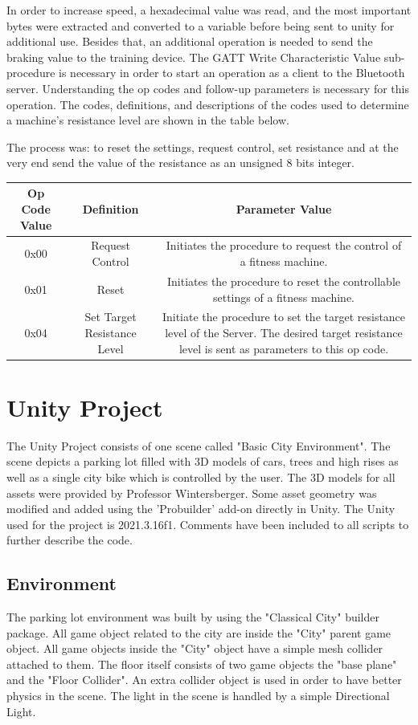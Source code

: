 \documentclass[english,notitlepage,smartquotes]{hgbreport}
\begin{document}
In order to increase speed, a hexadecimal value was read, and the most important bytes were extracted and converted to a variable before being sent to unity for additional use.
Besides that, an additional operation is needed to send the braking value to the training device. The GATT Write Characteristic Value sub-procedure is necessary in order to start an operation as a client to the Bluetooth server.
Understanding the op codes and follow-up parameters is necessary for this operation. The codes, definitions, and descriptions of the codes used to determine a machine's resistance level are shown in the table below.

The process was: to reset the settings, request control, set resistance and at the very end send the value of the resistance as an unsigned 8 bits integer. 



\begin{tabular}{|c|c|c|}
\hline
Op Code Value & Definition & Parameter Value \\
\hline
0x00 & Request Control & \parbox{6cm}{Initiates the procedure to request the control of a fitness
machine.\\}\\
\hline
0x01 & Reset & \parbox{6cm}{Initiates the procedure to reset the controllable settings of a
fitness machine.\\}\\
\hline
0x04 & \parbox{3cm}{Set Target Resistance Level} & \parbox{6cm}{Initiate the procedure to set the target resistance level of the Server. The desired target resistance level is sent as parameters to this op code.\\}\\
\hline
\end{tabular}


\section{Unity Project}
The Unity Project consists of one scene called "Basic City Environment". The scene depicts a parking lot filled with 3D models of cars, trees and high rises as well as a single city bike which is controlled by the user.  
The 3D models for all assets were provided by Professor Wintersberger. Some asset geometry was modified and added using the 'Probuilder' add-on directly in Unity.
The Unity used for the project is 2021.3.16f1. Comments have been included to all scripts to further describe the code.
\subsection{Environment}
The parking lot environment was built by using the "Classical City" builder package. All game object related to the city are inside the "City" parent game object. 
All game objects inside the "City" object have a simple mesh collider attached to them. 
The floor itself consists of two game objects the "base plane" and the "Floor Collider". An extra collider object is used in order to have better physics in the scene.
The light in the scene is handled by a simple Directional Light.
\end{document}
